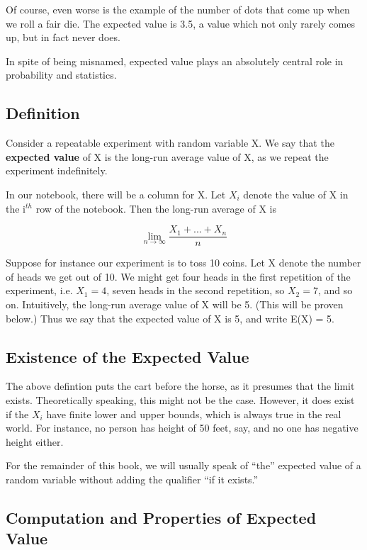 Of course, even worse is the example of the number of dots that come up
when we roll a fair die.  The expected value is 3.5, a value which not
only rarely comes up, but in fact never does.

In spite of being misnamed, expected value plays an absolutely central
role in probability and statistics.

\subsection{Definition}

Consider a repeatable experiment with random variable X.  We say that
the {\bf expected value} of X is the long-run average value of X, as we
repeat the experiment indefinitely.

In our notebook, there will be a column for X.  Let $X_i$ denote the
value of X in the i$^{th}$ row of the notebook.  Then the long-run
average of X is 

\begin{equation}
\label{longrunavg}
\lim_{n \rightarrow \infty} \frac{X_1+...+X_n}{n}
\end{equation}

Suppose for instance our experiment is to toss 10 coins.  Let X denote
the number of heads we get out of 10.  We might get four heads in the
first repetition of the experiment, i.e. $X_1 = 4$, seven heads in the
second repetition, so $X_2 = 7$, and so on.  Intuitively, the long-run
average value of X will be 5.  (This will be proven below.) Thus we say
that the expected value of X is 5, and write E(X) = 5.

\subsection{Existence of the Expected Value}

The above defintion puts the cart before the horse, as it presumes that
the limit exists.  Theoretically speaking, this might not be the case.
However, it does exist if the $X_i$ have finite lower and upper bounds,
which is always true in the real world.  For instance, no person has
height of 50 feet, say, and no one has negative height either.

For the remainder of this book, we will usually speak of ``the''
expected value of a random variable without adding the qualifier ``if it
exists.''

\subsection{Computation and Properties of Expected Value}

